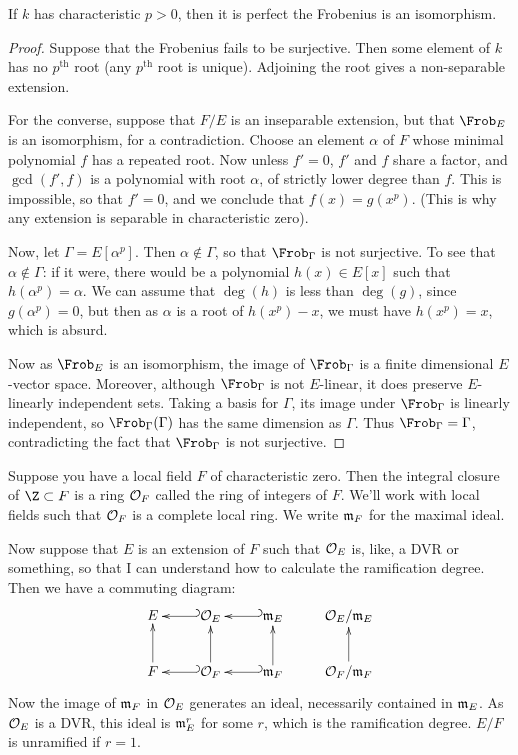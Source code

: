 \documentclass[11pt]{article}
\begin{document}
\begin{fact*}If $k$ has characteristic $p>0$, then it
is perfect \Iff the Frobenius is an isomorphism.\end{fact*}
\begin{proof}
Suppose that the Frobenius fails to be surjective. Then some element of $k$ has
no $p^\text{th}$ root (any $p^\text{th}$ root is unique). Adjoining the root
gives a non-separable extension.

For the converse, suppose that $F/E$ is an inseparable extension, but that
$\Frob_E$ is an isomorphism, for a contradiction. Choose an element $\alpha$ of
$F$ whose minimal polynomial $f$ has a repeated root. Now unless $f'=0$, $f'$
and $f$ share a factor, and $\gcd(f',f)$ is a polynomial with root $\alpha$, of
strictly lower degree than $f$. This is impossible, so that $f'=0$, and we
conclude that $f(x)=g(x^p)$. (This is why any extension is separable in
characteristic zero).

Now, let $\Gamma=E[\alpha^p]$. Then $\alpha\notin\Gamma$, so that $\Frob_\Gamma$
is not surjective. To see that $\alpha\notin\Gamma$: if it were, there would be
a polynomial $h(x)\in E[x]$ such that $h(\alpha^p)=\alpha$. We can assume that
$\deg(h)$ is less than $\deg(g)$, since $g(\alpha^p)=0$, but then as $\alpha$ is
a root of $h(x^p)-x$, we must have $h(x^p)=x$, which is absurd.

Now as $\Frob_E$ is an isomorphism, the image of $\Frob_\Gamma$ is a finite
dimensional $E$-vector space. Moreover, although $\Frob_\Gamma$ is not
$E$-linear, it does preserve $E$-linearly independent sets. Taking a basis for
$\Gamma$, its image under $\Frob_\Gamma$ is linearly independent, so
$\Frob_\Gamma(\Gamma)$ has the same dimension as $\Gamma$. Thus
$\Frob_\Gamma=\Gamma$, contradicting the fact that $\Frob_\Gamma$ is not
surjective.
\end{proof}

Suppose you have a local field $F$ of characteristic zero. Then the integral
closure of $\Z\subset F$ is a ring $\mathcal{O}_F$ called the ring of integers of $F$.
We'll work with local fields such that $\mathcal{O}_F$ is a complete local ring.
We write $\mathfrak{m}_F$ for the maximal ideal.

Now suppose that $E$ is an extension of $F$ such that $\mathcal{O}_E$ is, like, a DVR
or something, so that I can understand how to calculate the ramification degree.
Then we have a commuting diagram:
\[\xymatrix{
E&\calO_E\ar@{_{(}->}[l]&\frakm_E\ar@{_{(}->}[l]&\calO_E/\frakm_E\\
F\ar[u]&\calO_F\ar@{_{(}->}[l]\ar[u]&\frakm_F\ar@{_{(}->}
[l]\ar[u]&\calO_F/\frakm_F\ar[u]
}\]
Now the image of $\mathfrak{m}_F$ in $\mathcal{O}_E$ generates an ideal, necessarily
contained in $\mathfrak{m}_E$. As $\mathcal{O}_E$ is a DVR, this ideal is $\mathfrak{m}_E^r$ for
some $r$, which is the ramification degree. $E/F$ is unramified if $r=1$.
\end{document}

